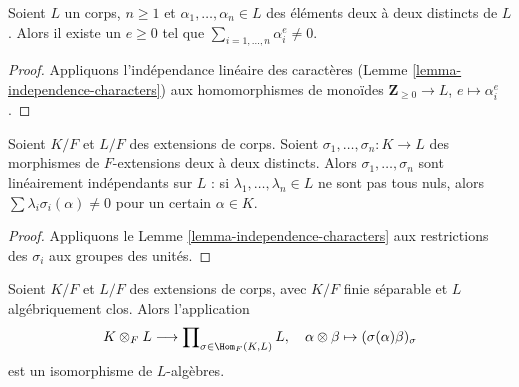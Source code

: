 \begin{lemma}
\label{lemma-sums-of-powers}
Soient $L$ un corps, $n \geq 1$ et $\alpha_1, \ldots, \alpha_n \in L$
des éléments deux à deux distincts de $L$. Alors il existe un
$e \geq 0$ tel que $\sum_{i = 1, \ldots, n} \alpha_i^e \not = 0$.
\end{lemma}

\begin{proof}
Appliquons l'indépendance linéaire des caractères
(Lemme \ref{lemma-independence-characters})
aux homomorphismes de monoïdes $\mathbf{Z}_{\geq 0} \to L$,
$e \mapsto \alpha_i^e$.
\end{proof}

\begin{lemma}
\label{lemma-independence-embeddings}
Soient $K/F$ et $L/F$ des extensions de corps. Soient
$\sigma_1, \ldots, \sigma_n : K \to L$ des morphismes de $F$-extensions
deux à deux distincts. Alors $\sigma_1, \ldots, \sigma_n$ sont linéairement
indépendants sur $L$ : si $\lambda_1, \ldots, \lambda_n \in L$ ne sont pas
tous nuls, alors $\sum \lambda_i\sigma_i(\alpha) \not = 0$
pour un certain $\alpha \in K$.
\end{lemma}

\begin{proof}
Appliquons le Lemme \ref{lemma-independence-characters} aux restrictions
des $\sigma_i$ aux groupes des unités.
\end{proof}

\begin{lemma}
\label{lemma-finite-separable-tensor-alg-closed}
Soient $K/F$ et $L/F$ des extensions de corps, avec
$K/F$ finie séparable et $L$ algébriquement clos.
Alors l'application
$$
K \otimes_F L
\longrightarrow
\prod\nolimits_{\sigma \in \Hom_F(K, L)} L,\quad
\alpha \otimes \beta \mapsto (\sigma(\alpha)\beta)_\sigma
$$
est un isomorphisme de $L$-algèbres.
\end{lemma}

